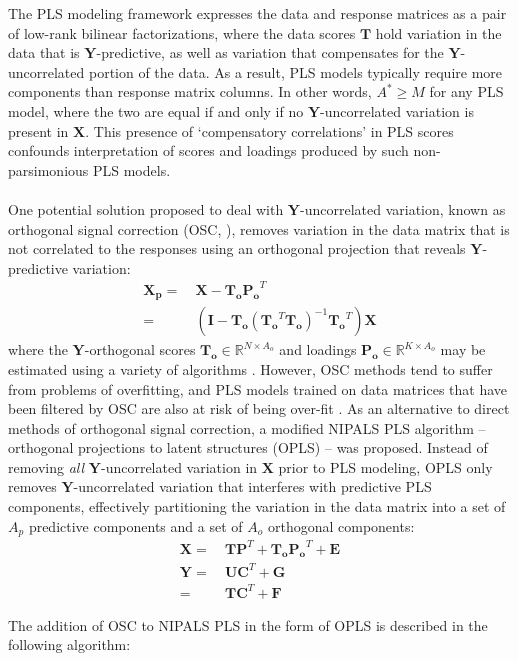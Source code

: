 \begin{doublespace}
The PLS modeling framework expresses the data and response matrices as a pair
of low-rank bilinear factorizations, where the data scores $\mathbf{T}$ hold
variation in the data that is $\mathbf{Y}$-predictive, as well as variation
that compensates for the $\mathbf{Y}$-uncorrelated portion of the data. As a
result, PLS models typically require more components than response matrix
columns. In other words, $A^\ast \ge M$ for any PLS model, where the two are
equal if and only if no $\mathbf{Y}$-uncorrelated variation is present in
$\mathbf{X}$. This presence of `compensatory correlations' in PLS scores
confounds interpretation of scores and loadings produced by such
non-parsimonious PLS models.
\\\\
One potential solution proposed to deal with $\mathbf{Y}$-uncorrelated
variation, known as orthogonal signal correction
(OSC, \cite{boulet:cils2012,westerhuis:cils2001}), removes variation in the
data matrix that is not correlated to the responses using an orthogonal
projection that reveals $\mathbf{Y}$-predictive variation:
\begin{align}
\mathbf{X_p}
 =& \: \mathbf{X} - \mathbf{T_o} \mathbf{P_o}^T \\
 =& \: \left(
  \mathbf{I} - \mathbf{T_o}
  (\mathbf{T_o}^T \mathbf{T_o})^{-1}
  \mathbf{T_o}^T \right) \mathbf{X}
\end{align}
where the $\mathbf{Y}$-orthogonal scores
$\mathbf{T_o} \in \mathbb{R}^{N \times A_o}$ and loadings
$\mathbf{P_o} \in \mathbb{R}^{K \times A_o}$ may be estimated using a variety
of algorithms \cite{boulet:cils2012}. However, OSC methods tend to suffer from
problems of overfitting, and PLS models trained on data matrices that have been
filtered by OSC are also at risk of being over-fit \cite{trygg:jchemo2002}. As
an alternative to direct methods of orthogonal signal correction, a modified
NIPALS PLS algorithm -- orthogonal projections to latent structures
(OPLS) -- was proposed. Instead of removing \emph{all}
$\mathbf{Y}$-uncorrelated variation in $\mathbf{X}$ prior to PLS modeling,
OPLS only removes $\mathbf{Y}$-uncorrelated variation that interferes with
predictive PLS components, effectively partitioning the variation in the data
matrix into a set of $A_p$ predictive components and a set of $A_o$ orthogonal
components:
\begin{align}
\mathbf{X} =& \: \mathbf{T} \mathbf{P}^T +
                 \mathbf{T_o} \mathbf{P_o}^T + \mathbf{E} \\
\mathbf{Y} =& \: \mathbf{U} \mathbf{C}^T + \mathbf{G} \\
           =& \: \mathbf{T} \mathbf{C}^T + \mathbf{F} \nonumber
\end{align}

The addition of OSC to NIPALS PLS in the form of OPLS is described in the
following algorithm:
\end{doublespace}

